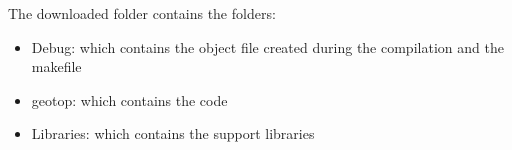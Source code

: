 \noindent The downloaded folder contains the folders:
\begin{itemize}
 \item Debug: which contains the object file created during the compilation and the makefile
 \item geotop: which contains the code
 \item Libraries: which contains the support libraries
\end{itemize}








